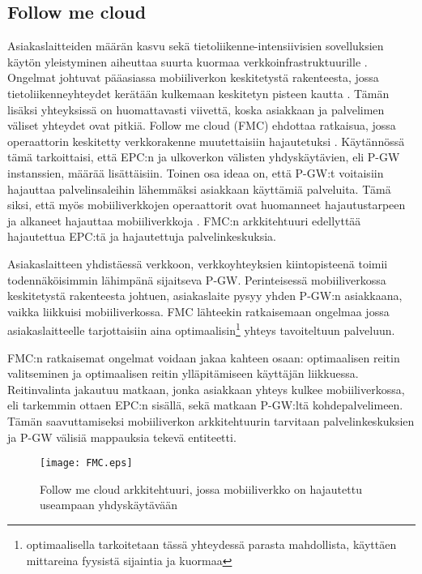 \subsection{Follow me cloud} \label{fmc}

Asiakaslaitteiden määrän kasvu sekä tietoliikenne-intensiivisien sovelluksien käytön yleistyminen aiheuttaa suurta kuormaa verkkoinfrastruktuurille \cite{taleb2013follow}. Ongelmat johtuvat pääasiassa mobiiliverkon keskitetystä rakenteesta, jossa tietoliikenneyhteydet kerätään kulkemaan keskitetyn pisteen kautta \cite{taleb2013follow}. Tämän lisäksi yhteyksissä on huomattavasti viivettä, koska asiakkaan ja palvelimen väliset yhteydet ovat pitkiä. Follow me cloud (FMC) ehdottaa ratkaisua, jossa operaattorin keskitetty verkkorakenne muutettaisiin hajautetuksi \cite{taleb2013follow}.
Käytännössä tämä tarkoittaisi, että EPC:n ja ulkoverkon välisten yhdyskäytävien, eli P-GW instanssien, määrää lisättäisiin. 
Toinen osa ideaa on, että P-GW:t voitaisiin hajauttaa palvelinsaleihin lähemmäksi asiakkaan käyttämiä palveluita. Tämä siksi, että myös mobiiliverkkojen operaattorit ovat huomanneet hajautustarpeen ja alkaneet hajauttaa mobiiliverkkoja \cite{taleb2013follow}. 
FMC:n arkkitehtuuri edellyttää hajautettua EPC:tä ja hajautettuja palvelinkeskuksia. 

Asiakaslaitteen yhdistäessä verkkoon, verkkoyhteyksien kiintopisteenä toimii todennäköisimmin lähimpänä sijaitseva P-GW. 
Perinteisessä mobiiliverkossa keskitetystä rakenteesta johtuen, asiakaslaite pysyy yhden P-GW:n asiakkaana, vaikka liikkuisi mobiiliverkossa.
FMC lähteekin ratkaisemaan ongelmaa jossa asiakaslaitteelle tarjottaisiin aina optimaalisin\footnote{optimaalisella tarkoitetaan tässä yhteydessä parasta mahdollista, käyttäen mittareina fyysistä sijaintia ja kuormaa} yhteys tavoiteltuun palveluun.

FMC:n ratkaisemat ongelmat voidaan jakaa kahteen osaan: optimaalisen reitin valitseminen ja optimaalisen reitin ylläpitämiseen käyttäjän liikkuessa. 
Reitinvalinta jakautuu matkaan, jonka asiakkaan yhteys kulkee mobiiliverkossa, eli tarkemmin ottaen EPC:n sisällä, sekä matkaan P-GW:ltä kohdepalvelimeen. Tämän saavuttamiseksi mobiiliverkon arkkitehtuurin tarvitaan palvelinkeskuksien ja P-GW välisiä mappauksia tekevä entiteetti. 

\begin{figure}[tb]
\texttt{[image: FMC.eps]}
\caption{Follow me cloud arkkitehtuuri, jossa mobiiliverkko on hajautettu useampaan yhdyskäytävään} \label{fig:fmc}
\end{figure}

